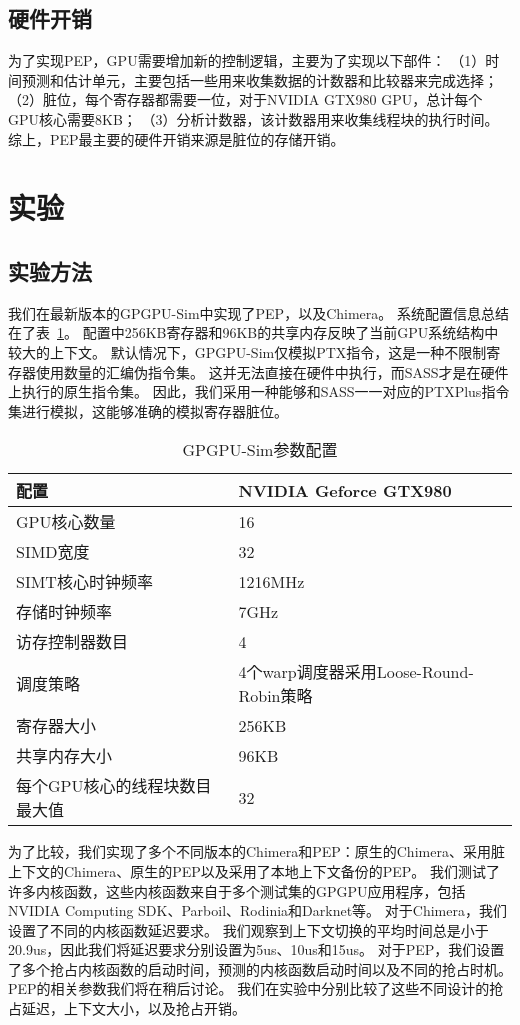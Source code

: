 \subsection{硬件开销}
为了实现PEP，GPU需要增加新的控制逻辑，主要为了实现以下部件：
（1）时间预测和估计单元，主要包括一些用来收集数据的计数器和比较器来完成选择；
（2）脏位，每个寄存器都需要一位，对于NVIDIA GTX980 GPU，总计每个GPU核心需要8KB；
（3）分析计数器，该计数器用来收集线程块的执行时间。
综上，PEP最主要的硬件开销来源是脏位的存储开销。


\section{实验}

\subsection{实验方法}
我们在最新版本的GPGPU-Sim中实现了PEP，以及Chimera。
系统配置信息总结在了表~\ref{table:configuration}。
配置中256KB寄存器和96KB的共享内存反映了当前GPU系统结构中较大的上下文。
默认情况下，GPGPU-Sim仅模拟PTX指令，这是一种不限制寄存器使用数量的汇编伪指令集。
这并无法直接在硬件中执行，而SASS才是在硬件上执行的原生指令集。
因此，我们采用一种能够和SASS一一对应的PTXPlus指令集进行模拟，这能够准确的模拟寄存器脏位。

\begin{table}[t]
  \centering
  \begin{tabular}{|l|l|}  
    \hline
    配置 & NVIDIA Geforce GTX980\\
    \hline
    \hline
    GPU核心数量 & 16\\
    \hline
    SIMD宽度 & 32\\
    \hline
    SIMT核心时钟频率 & 1216MHz\\
    \hline
    存储时钟频率 & 7GHz\\
    \hline
    访存控制器数目 & 4 \\
    \hline
    调度策略 & 4个warp调度器采用Loose-Round-Robin策略\\
    \hline
    寄存器大小 & 256KB\\
    \hline
    共享内存大小 & 96KB\\
    \hline
    每个GPU核心的线程块数目最大值 & 32\\
    \hline
  \end{tabular}
  \caption{GPGPU-Sim参数配置}
 \label{table:configuration}
\end{table}


为了比较，我们实现了多个不同版本的Chimera和PEP：原生的Chimera、采用脏上下文的Chimera、原生的PEP以及采用了本地上下文备份的PEP。
我们测试了许多内核函数，这些内核函数来自于多个测试集的GPGPU应用程序，包括NVIDIA Computing SDK、Parboil、Rodinia和Darknet等。
对于Chimera，我们设置了不同的内核函数延迟要求。
我们观察到上下文切换的平均时间总是小于20.9us，因此我们将延迟要求分别设置为5us、10us和15us。
对于PEP，我们设置了多个抢占内核函数的启动时间，预测的内核函数启动时间以及不同的抢占时机。
PEP的相关参数我们将在稍后讨论。
我们在实验中分别比较了这些不同设计的抢占延迟，上下文大小，以及抢占开销。

